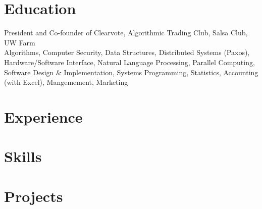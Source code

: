 \documentclass[11pt,letterpaper]{article}
\begin{document}

\section{Education}

President and Co-founder of Clearvote, Algorithmic Trading Club, Salsa Club, UW Farm \\
Algorithms, Computer Security, Data Structures, Distributed Systems (Paxos), Hardware/Software
Interface, Natural Language Processing, Parallel Computing, Software Design & Implementation, Systems Programming,
Statistics, Accounting (with Excel), Mangemement, Marketing \\

\section{Experience}





\section{Skills}


\section{Projects}




\end{document}
